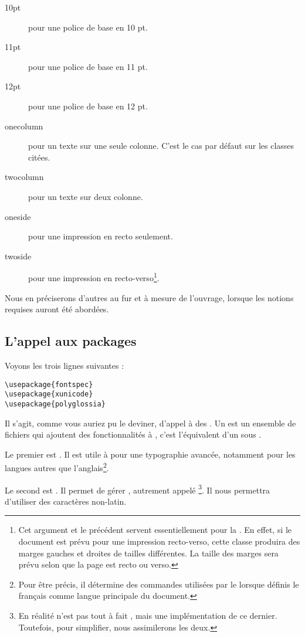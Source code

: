 \begin{description}
\item[10pt] pour une police de base en 10 pt.
\item[11pt] pour une police de base en 11 pt.
\item[12pt] pour une police de base en 12 pt.
\item[onecolumn] pour un texte sur une seule colonne. C'est le cas par défaut sur les classes citées.
\item[twocolumn] pour un texte sur deux colonne.
\item[oneside] pour une impression en recto seulement.
\item[twoside] pour une impression en recto-verso\footnote{Cet argument et le précédent servent essentiellement pour la  . En effet, si le document est prévu pour une impression recto-verso, cette classe produira des marges gauches et droites de tailles différentes. La taille des marges sera prévu selon que la page est recto ou verso.}.
\end{description}

Nous en préciserons d'autres au fur et à mesure de l'ouvrage, lorsque les notions requises auront été abordées.

\subsection{L'appel aux packages}

Voyons les trois lignes suivantes : 
\begin{verbatim}
\usepackage{fontspec}
\usepackage{xunicode}
\usepackage{polyglossia}
\end{verbatim}

Il s'agit, comme vous auriez pu le deviner, d'appel à des . Un  est un ensemble de fichiers qui ajoutent des fonctionnalités à \logiciel{\LaTeX}, c'est l'équivalent d'un  sous . 

Le premier  est . Il est utile à  pour une typographie avancée, notamment pour les langues autres que l'anglais\footnote{Pour être précis, il détermine des commandes utilisées par le   lorsque définis le fran\c cais comme langue principale du document.}. 

Le second  est . Il permet de gérer , autrement appelé \footnote{En réalité  n'est pas tout à fait , mais une implémentation de ce dernier. Toutefois, pour simplifier, nous assimilerons les deux.}. Il nous permettra d'utiliser des caractères non-latin.

